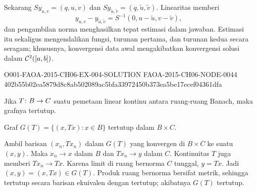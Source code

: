 \begin{o001solution}
\begin{o001proof}
Sekarang $S y_{u,v}=(q,u,v)$ dan
$S y_{\widetilde u,\widetilde v}=(q,\widetilde u,\widetilde v)$. Linearitas
memberi
\[
 y_{u,v}-y_{\widetilde u,\widetilde v}
 =S^{-1}(0,u-\widetilde u,v-\widetilde v),
\]
dan pengambilan norma menghasilkan tepat estimasi dalam jawaban. Estimasi
itu sekaligus mengendalikan fungsi, turunan pertama, dan turunan kedua
secara seragam; khususnya, konvergensi data awal mengakibatkan konvergensi
solusi dalam $\mathcal{C}^2([a,b])$.
\end{o001proof}
\end{o001solution}

\begin{o001solution}
  {O001-FAOA-2015-CH06-EX-004-SOLUTION}
  {FAOA-2015-CH06-NODE-0044}
  {402b55b02ea5879d8c8ab502089ac5bfa33972450b373ea5be17ecef04361dfa}
\begin{o001statement}
Jika $T\colon B \rightarrow C$ suatu pemetaan linear kontinu antara ruang-ruang Banach, maka grafnya tertutup.
\end{o001statement}
\begin{o001answer}
Graf $G(T)=\{(x,Tx):x\in B\}$ tertutup dalam $B\times C$.
\end{o001answer}
\begin{o001proof}
Ambil barisan $(x_n,Tx_n)$ dalam $G(T)$ yang konvergen di $B\times C$ ke
suatu $(x,y)$. Maka $x_n\to x$ dalam $B$ dan $Tx_n\to y$ dalam $C$.
Kontinuitas $T$ juga memberi $Tx_n\to Tx$. Karena limit di ruang bernorma
$C$ tunggal, $y=Tx$. Jadi $(x,y)=(x,Tx)\in G(T)$. Produk ruang bernorma
bersifat metrik, sehingga tertutup secara barisan ekuivalen dengan tertutup;
akibatnya $G(T)$ tertutup.
\end{o001proof}
\end{o001solution}

